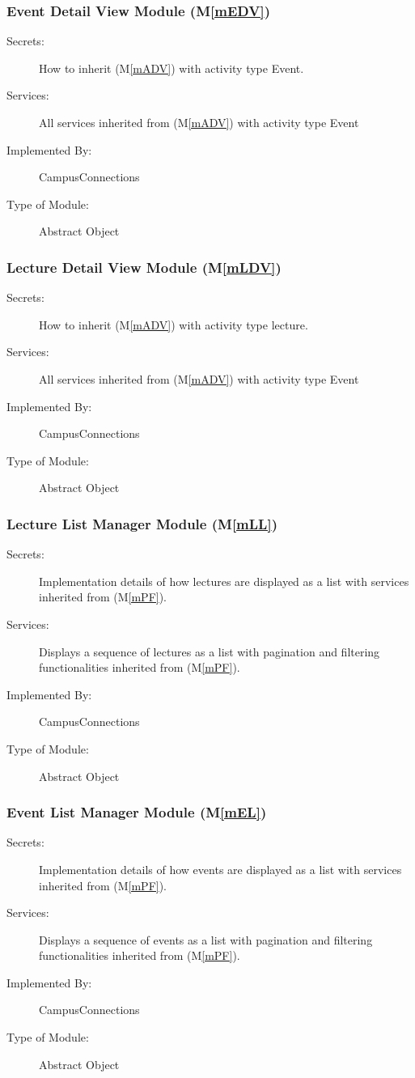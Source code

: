 \documentclass[12pt, titlepage]{article}
\newcommand{\mref}[1]{M\ref{#1}}
\begin{document}
\subsubsection{Event Detail View Module (\mref{mEDV})}
\begin{description}
\item[Secrets:]How to inherit (\mref{mADV}) with activity type Event.
\item[Services:]All services inherited from (\mref{mADV}) with activity type Event
\item[Implemented By:] CampusConnections
\item[Type of Module:] Abstract Object
\end{description}

\subsubsection{Lecture Detail View Module (\mref{mLDV})}
\begin{description}
\item[Secrets:]How to inherit (\mref{mADV}) with activity type lecture.
\item[Services:]All services inherited from (\mref{mADV}) with activity type Event
\item[Implemented By:] CampusConnections
\item[Type of Module:] Abstract Object
\end{description}

\subsubsection{Lecture List Manager Module (\mref{mLL})}
\begin{description}
\item[Secrets:]Implementation details of how lectures are displayed as a list with services inherited from (\mref{mPF}).
\item[Services:]Displays a sequence of lectures as a list with pagination and filtering functionalities inherited from (\mref{mPF}).
\item[Implemented By:] CampusConnections
\item[Type of Module:] Abstract Object
\end{description}

\subsubsection{Event List Manager Module (\mref{mEL})}
\begin{description}
\item[Secrets:]Implementation details of how events are displayed as a list with services inherited from (\mref{mPF}).
\item[Services:]Displays a sequence of events as a list with pagination and filtering functionalities inherited from (\mref{mPF}).
\item[Implemented By:] CampusConnections
\item[Type of Module:] Abstract Object
\end{description}
\end{document}
